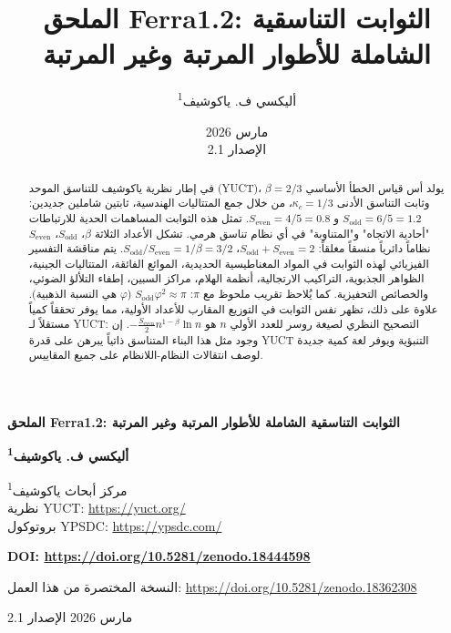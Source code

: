 \documentclass[11pt,a4paper]{article}
\begin{document}
	
	\title{الملحق Ferra1.2: الثوابت التناسقية الشاملة للأطوار المرتبة وغير المرتبة}
	\author{أليكسي ف. ياكوشيف\textsuperscript{1}}
	\date{مارس 2026 \\ الإصدار 2.1}
	
	\begin{titlepage}
		\begin{center}
			\vspace*{0.5cm}
			\Huge\textbf{الملحق Ferra1.2: الثوابت التناسقية الشاملة للأطوار المرتبة وغير المرتبة}
			\vspace{0.8cm}
			
			\Large\textbf{أليكسي ف. ياكوشيف\textsuperscript{1}}
			\vspace{0.3cm}
			
			\large
			\textsuperscript{1}مركز أبحاث ياكوشيف \\
			نظرية YUCT: \url{https://yuct.org/} \\
			بروتوكول YPSDC: \url{https://ypsdc.com/}
			\vspace{0.5cm}
			
			\textbf{DOI: \url{https://doi.org/10.5281/zenodo.18444598}}
			\vspace{0.3cm}
			
			\large
			النسخة المختصرة من هذا العمل: \url{https://doi.org/10.5281/zenodo.18362308}
			\vspace{0.3cm}
			
			\large
			مارس 2026 \; الإصدار 2.1
			\vspace{0.5cm}
			
			\begin{minipage}{0.92\textwidth}
				\small
				\begin{abstract}
					\noindent
					في إطار نظرية ياكوشيف للتناسق الموحد (YUCT)، يولد أس قياس الخطأ الأساسي \(\beta = 2/3\) وثابت التناسق الأدنى \(\kappa_c = 1/3\)، من خلال جمع المتتاليات الهندسية، ثابتين شاملين جديدين:
					\(S_{\text{odd}} = 6/5 = 1.2\) و \(S_{\text{even}} = 4/5 = 0.8\).
					تمثل هذه الثوابت المساهمات الحدية للارتباطات "أحادية الاتجاه" و"المتناوبة" في أي نظام تناسق هرمي. تشكل الأعداد الثلاثة \(\beta\)، \(S_{\text{odd}}\)، \(S_{\text{even}}\) نظاماً دائرياً منسقاً مغلقاً:
					\(S_{\text{odd}}+S_{\text{even}} = 2\)، \(S_{\text{odd}}/S_{\text{even}} = 1/\beta = 3/2\).
					يتم مناقشة التفسير الفيزيائي لهذه الثوابت في المواد المغناطيسية الحديدية، الموائع الفائقة، المتتاليات الجينية، الظواهر الجذبوية، التراكيب الارتجالية، أنظمة الهلام، مراكز السبين، إطفاء التلألؤ الضوئي، والخصائص التحفيزية. كما يُلاحظ تقريب ملحوظ مع \(\pi\): \(S_{\text{odd}}\varphi^2 \approx \pi\) (\(\varphi\) هي النسبة الذهبية).
					علاوة على ذلك، تظهر نفس الثوابت في التوزيع المقارب للأعداد الأولية، مما يوفر تحققاً كمياً مستقلاً لـ YUCT: التصحيح النظري لصيغة روسر للعدد الأولي \(n\) هو \(-\frac{S_{\text{even}}}{2}n^{1-\beta}\ln n\). إن وجود مثل هذا البناء المتناسق ذاتياً يبرهن على قدرة YUCT التنبؤية ويوفر لغة كمية جديدة لوصف انتقالات النظام-اللانظام على جميع المقاييس.
				\end{abstract}
			\end{minipage}
			

\end{center}
\end{titlepage}
\end{document}
